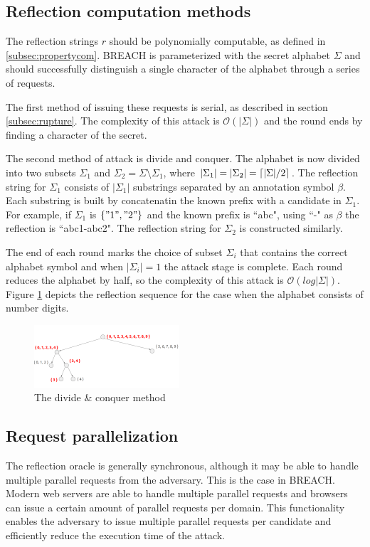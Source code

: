 \subsection{Reflection computation methods}\label{subsec:reflectionmethods}
The reflection strings $r$ should be polynomially computable, as defined in
\ref{subsec:propertycom}. BREACH is parameterized with the secret alphabet
$\Sigma$ and should successfully distinguish a single character of the alphabet
through a series of requests.

The first method of issuing these requests is serial, as described in section
\ref{subsec:rupture}.  The complexity of this attack is $\mathcal{O}(|\Sigma|)$
and the round ends by finding a character of the secret.

The second method of attack is divide and conquer. The alphabet is now divided
into two subsets $\Sigma_1$ and $\Sigma_2 = \Sigma \setminus \Sigma_1$, where
$|\Sigma_1| = |\Sigma_2| = \lceil|\Sigma| / 2\rceil$. The reflection string for
$\Sigma_1$ consists of $|\Sigma_1|$ substrings separated by an annotation symbol
$\beta$. Each substring is built by concatenatin the known prefix with a
candidate in $\Sigma_1$. For example, if $\Sigma_1$ is $\{"1", "2"\}$ and the
known prefix is ``abc", using ``-" as $\beta$ the reflection is ``abc1-abc2".
The reflection string for $\Sigma_2$ is constructed similarly.

The end of each round marks the choice of subset $\Sigma_i$ that contains the
correct alphabet symbol and when $|\Sigma_i| = 1$ the attack stage is complete.
Each round reduces the alphabet by half, so the complexity of this attack is
$\mathcal{O}(log|\Sigma|)$. Figure \ref{fig:divide_and_conquer} depicts the
reflection sequence for the case when the alphabet consists of number digits.

   \begin{figure}[thpb]
      \centering
          \includegraphics[width=0.48\textwidth]{figures/divide_and_conquer.png}
      \caption{The divide \& conquer method}
      \label{fig:divide_and_conquer}
   \end{figure}

\subsection{Request parallelization}\label{subsec:parallel}
The reflection oracle is generally synchronous, although it may be able to
handle multiple parallel requests from the adversary.  This is the case in
BREACH. Modern web servers are able to handle multiple parallel requests and
browsers can issue a certain amount of parallel requests per domain. This
functionality enables the adversary to issue multiple parallel requests per
candidate and efficiently reduce the execution time of the attack.

